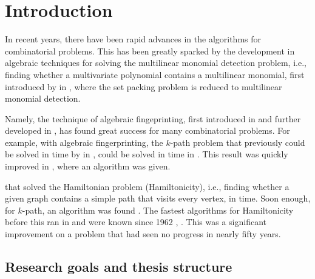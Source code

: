 
\section{Introduction}

In recent years, there have been rapid advances in the algorithms for combinatorial problems. 
This has been greatly sparked by the development in algebraic techniques for solving the 
multilinear monomial detection problem, i.e., finding whether a multivariate polynomial contains a multilinear monomial, 
first introduced by \citeauthor{Koutis05} in \cite{Koutis05}, where the set packing problem is
reduced to multilinear monomial detection.

Namely, the technique of algebraic fingeprinting, first introduced in
\cite{Koutis08} and further developed in \cite{Williams09}, 
has found great success for many combinatorial problems. 
For example, with algebraic fingerprinting, the $k$-path problem 
that previously could be solved in  time by \citeauthor{Chen07} in \cite{Chen07}, 
could be solved in  time in \cite{Koutis08}. 
This result was quickly improved in \cite{Williams09}, where an  algorithm was given.

that solved the Hamiltonian problem (Hamiltonicity), i.e., finding whether a given graph contains a simple path that visits 
every vertex, in  time. Soon enough, for $k$-path, an  algorithm was found \cite{Björklund17}. 
The fastest algorithms for Hamiltonicity before this ran in
and were known since 1962 \cite{HelKar62}, \cite{Bellman62}.
This was a significant improvement on a problem that had seen no progress in nearly fifty years.

\subsection{Research goals and thesis structure}

